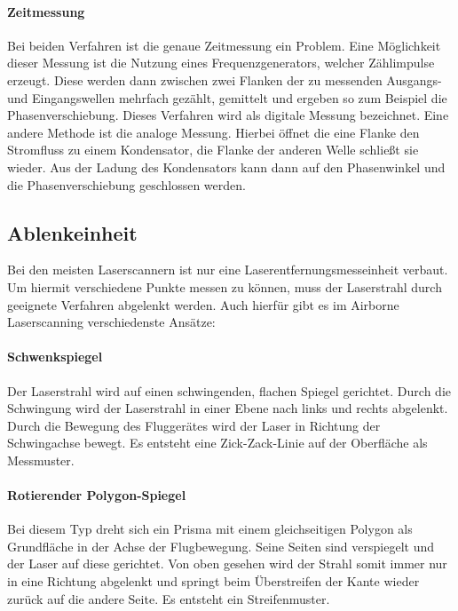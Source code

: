 \documentclass[a4paper,12pt,bibliography=totoc, listof=totoc,titlepage,pointlessnumbers]{scrreprt}
\begin{document}
\paragraph{Zeitmessung}
Bei beiden Verfahren ist die genaue Zeitmessung ein Problem. Eine Möglichkeit dieser Messung ist die Nutzung eines Frequenzgenerators, welcher Zähl\-imp\-ulse erzeugt. Diese werden dann zwischen zwei Flanken der zu messenden Ausgangs- und Eingangswellen mehrfach gezählt, gemittelt und ergeben so zum Beispiel die Phasenverschiebung. Dieses Verfahren wird als digitale Messung bezeichnet. Eine andere Methode ist die analoge Messung. Hierbei öffnet die eine Flanke den Stromfluss zu einem Kondensator, die Flanke der anderen Welle schließt sie wieder. Aus der Ladung des Kondensators kann dann auf den Phasenwinkel und die Phasenverschiebung geschlossen werden.  \citep[S. 314f]{Witte2006}

\subsection{Ablenkeinheit}
Bei den meisten Laser\-scan\-nern ist nur eine Laserentfernungsmesseinheit verbaut. Um hiermit verschiedene Punkte messen zu können, muss der Laserstrahl durch geeignete Verfahren abgelenkt werden. Auch hierfür gibt es im Air\-borne Laser\-scan\-ning verschiedenste Ansätze:

\paragraph{Schwenkspiegel}
Der Laserstrahl wird auf einen schwingenden, flachen Spiegel gerichtet. Durch die Schwingung wird der Laserstrahl in einer Ebene nach links und rechts abgelenkt. Durch die Bewegung des Fluggerätes wird der Laser in Richtung der Schwingachse bewegt. Es entsteht eine Zick-Zack-Linie auf der Oberfläche als Messmuster.

\paragraph{Rotierender Polygon-Spiegel}
Bei diesem Typ dreht sich ein Prisma mit einem gleichseitigen Polygon als Grundfläche in der Achse der Flugbewegung. Seine  Seiten sind verspiegelt und der Laser auf diese gerichtet. Von oben gesehen wird der Strahl somit immer nur in eine Richtung abgelenkt und springt beim Überstreifen der Kante  wieder zurück auf die andere Seite. Es entsteht ein Streifenmuster.
\end{document}
